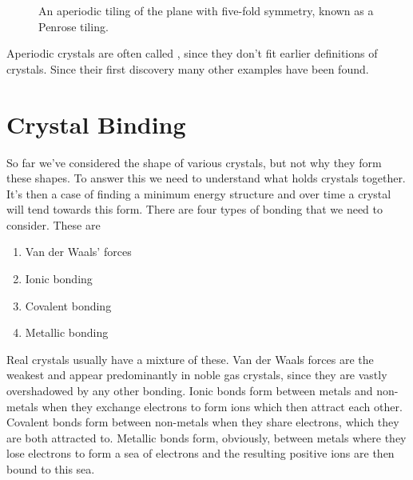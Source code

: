 \documentclass[fleqn]{NotesClass}
\begin{document}
    \begin{figure}
        \caption[Aperiodic Penrose tiling.]{An aperiodic tiling of the plane with five-fold symmetry, known as a Penrose tiling.}
    \end{figure}
    
    Aperiodic crystals are often called , since they don't fit earlier definitions of crystals.
    Since their first discovery many other examples have been found.
    
    \chapter{Crystal Binding}\label{sec:crystal binding}
    So far we've considered the shape of various crystals, but not why they form these shapes.
    To answer this we need to understand what holds crystals together.
    It's then a case of finding a minimum energy structure and over time a crystal will tend towards this form.
    There are four types of bonding that we need to consider.
    These are
    \begin{enumerate}
        \item Van der Waals' forces
        \item Ionic bonding
        \item Covalent bonding
        \item Metallic bonding
    \end{enumerate}
    Real crystals usually have a mixture of these.
    Van der Waals forces are the weakest and appear predominantly in noble gas crystals, since they are vastly overshadowed by any other bonding.
    Ionic bonds form between metals and non-metals when they exchange electrons to form ions which then attract each other.
    Covalent bonds form between non-metals when they share electrons, which they are both attracted to.
    Metallic bonds form, obviously, between metals where they lose electrons to form a sea of electrons and the resulting positive ions are then bound to this sea.
    
\end{document}
